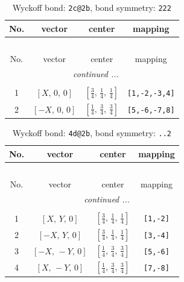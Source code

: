 \documentclass[fleqn,8pt]{jsarticle}
\begin{document}
\begin{longtable}{cccc}
\caption{Wyckoff bond: {\tt 2c@2b}, bond symmetry: {\tt 222}}
 \\
 \hline \hline
No. & vector & center & mapping \\ \hline \endfirsthead

\multicolumn{3}{l}{\tablename\ \thetable{}} \\
 \hline \hline
No. & vector & center & mapping \\ \hline \endhead

 \hline \hline
\multicolumn{3}{r}{\footnotesize\it continued ...} \\ \endfoot

 \hline \hline
\multicolumn{3}{r}{} \\ \endlastfoot

1 & $\left[ X,\, 0,\, 0 \right]$ & $\left[ \frac{3}{4},\, \frac{1}{4},\, \frac{1}{4} \right]$ & {\tt [1,-2,-3,4]} \\ \hline
2 & $\left[ - X,\, 0,\, 0 \right]$ & $\left[ \frac{1}{4},\, \frac{3}{4},\, \frac{3}{4} \right]$ & {\tt [5,-6,-7,8]} \\
\end{longtable}
\renewcommand{\arraystretch}{1.2}
\begin{longtable}{cccc}
\caption{Wyckoff bond: {\tt 4d@2b}, bond symmetry: {\tt ..2}}
 \\
 \hline \hline
No. & vector & center & mapping \\ \hline \endfirsthead

\multicolumn{3}{l}{\tablename\ \thetable{}} \\
 \hline \hline
No. & vector & center & mapping \\ \hline \endhead

 \hline \hline
\multicolumn{3}{r}{\footnotesize\it continued ...} \\ \endfoot

 \hline \hline
\multicolumn{3}{r}{} \\ \endlastfoot

1 & $\left[ X,\, Y,\, 0 \right]$ & $\left[ \frac{3}{4},\, \frac{1}{4},\, \frac{1}{4} \right]$ & {\tt [1,-2]} \\ \hline
2 & $\left[ - X,\, Y,\, 0 \right]$ & $\left[ \frac{3}{4},\, \frac{1}{4},\, \frac{1}{4} \right]$ & {\tt [3,-4]} \\ \hline
3 & $\left[ - X,\, - Y,\, 0 \right]$ & $\left[ \frac{1}{4},\, \frac{3}{4},\, \frac{3}{4} \right]$ & {\tt [5,-6]} \\ \hline
4 & $\left[ X,\, - Y,\, 0 \right]$ & $\left[ \frac{1}{4},\, \frac{3}{4},\, \frac{3}{4} \right]$ & {\tt [7,-8]} \\
\end{longtable}
\end{document}
